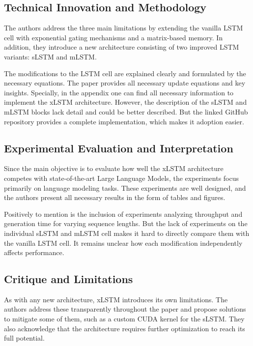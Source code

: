 \documentclass[a4paper,oneside,10pt,ngerman,english]{scrartcl}
\begin{document}
\subsection{Technical Innovation and Methodology}
\label{sec:innovation}

The authors address the three main limitations by extending the vanilla LSTM cell with exponential gating mechanisms and a matrix-based memory. In addition, they introduce a new architecture consisting of two improved LSTM variants: sLSTM and mLSTM.

The modifications to the LSTM cell are explained clearly and formulated by the necessary equations. The paper provides all necessary update equations and key insights. Specially, in the appendix one can find all necessary information to implement the xLSTM architecture. However, the description of the sLSTM and mLSTM blocks lack detail and could be better described. But the linked GitHub repository provides a complete implementation, which makes it adoption easier.

\subsection{Experimental Evaluation and Interpretation}
\label{sec:evalutation}

Since the main objective is to evaluate how well the xLSTM architecture competes with state-of-the-art Large Language Models, the experiments focus primarily on language modeling tasks. These experiments are well designed, and the authors present all necessary results in the form of tables and figures.

Positively to mention is the inclusion of experiments analyzing throughput and generation time for varying sequence lengths. But the lack of experiments on the individual sLSTM and mLSTM cell makes it hard to directly compare them with the vanilla LSTM cell. It remains unclear how each modification independently affects performance.

\subsection{Critique and Limitations}
\label{sec:critique}

As with any new architecture, xLSTM introduces its own limitations. The authors address these transparently throughout the paper and propose solutions to mitigate some of them, such as a custom CUDA kernel for the sLSTM. They also acknowledge that the architecture requires further optimization to reach its full potential.
\end{document}
